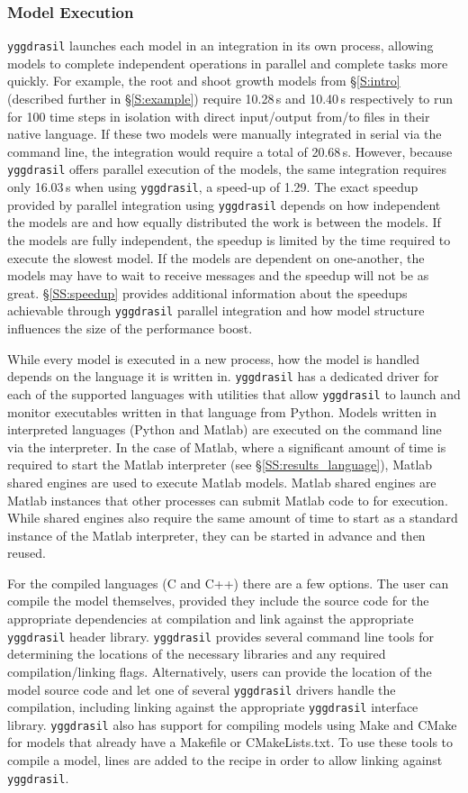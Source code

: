 \documentclass[journal]{IEEEtran}
\newcommand{\pkg}{{\tt yggdrasil}{}}
\begin{document}
\subsubsection{Model Execution}\label{SS:model_execution}
%
{\pkg} launches each model in an integration in its own process, allowing models to complete independent operations in parallel and complete tasks more quickly. For example, the root and shoot growth models from \S\ref{S:intro} (described further in \S\ref{S:example}) require 10.28\,s and 10.40\,s respectively to run for 100 time steps in isolation with direct input/output from/to files in their native language. If these two models were manually integrated in serial via the command line, the integration would require a total of 20.68\,s. However, because {\pkg} offers parallel execution of the models, the same integration requires only 16.03\,s when using {\pkg}, a speed-up of 1.29. The exact speedup provided by parallel integration using {\pkg} depends on how independent the models are and how equally distributed the work is between the models. If the models are fully independent, the speedup is limited by the time required to execute the slowest model. If the models are dependent on one-another, the models may have to wait to receive messages and the speedup will not be as great. \S\ref{SS:speedup} provides additional information about the speedups achievable through {\pkg} parallel integration and how model structure influences the size of the performance boost.

While every model is executed in a new process, how the model is handled depends on the language it is written in. {\pkg} has a dedicated driver for each of the supported languages with utilities that allow {\pkg} to launch and monitor executables written in that language from Python. Models written in interpreted languages (Python and Matlab) are executed on the command line via the interpreter. In the case of Matlab, where a significant amount of time is required to start the Matlab interpreter (see \S\ref{SS:results_language}), Matlab shared engines are used to execute Matlab models. Matlab shared engines are Matlab instances that other processes can submit Matlab code to for execution. While shared engines also require the same amount of time to start as a standard instance of the Matlab interpreter, they can be started in advance and then reused.

For the compiled languages (C and C++) there are a few options. The user can compile the model themselves, provided they include the source code for the appropriate dependencies at compilation and link against the appropriate {\pkg} header library. {\pkg} provides several command line tools for determining the locations of the necessary libraries and any required compilation/linking flags. Alternatively, users can provide the location of the model source code and let one of several {\pkg} drivers handle the compilation, including linking against the appropriate {\pkg} interface library. {\pkg} also has support for compiling models using Make \citep{Stallman2004} and CMake \citep{Martin2006} for models that already have a Makefile or CMakeLists.txt. To use these tools to compile a model, lines are added to the recipe in order to allow linking against {\pkg}.
\end{document}
